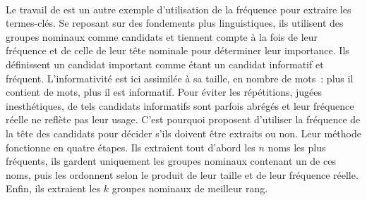         ~\\Le travail de  est un autre exemple
        d'utilisation de la fréquence pour extraire les termes-clés. Se reposant
        sur des fondements plus linguistiques, ils utilisent des groupes
        nominaux comme candidats et tiennent compte à la fois de leur fréquence
        et de celle de leur tête nominale pour déterminer leur importance. Ils
        définissent un candidat important comme étant un candidat informatif et
        fréquent. L'informativité est ici assimilée à sa taille, en nombre de
        mots~: plus il contient de mots, plus il est informatif. Pour éviter les
        répétitions, jugées inesthétiques, de tels candidats informatifs sont
        parfois abrégés et leur fréquence réelle ne reflète pas leur usage.
        C'est pourquoi  proposent d'utiliser
        la fréquence de la tête des candidats pour décider s'ils doivent être
        extraits ou non. Leur méthode fonctionne en quatre étapes. Ils extraient
        tout d'abord les $n$ noms les plus fréquents, ils gardent uniquement
        les groupes nominaux contenant un de ces noms, puis les ordonnent selon
        le produit de leur taille et de leur fréquence réelle. Enfin, ils
        extraient les $k$ groupes nominaux de meilleur rang.

